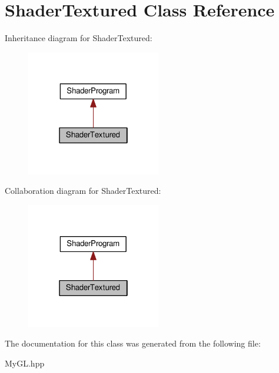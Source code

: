 \hypertarget{classShaderTextured}{}\section{Shader\+Textured Class Reference}
\label{classShaderTextured}


Inheritance diagram for Shader\+Textured\+:
\nopagebreak
\begin{figure}[H]
\begin{center}
\leavevmode
\includegraphics[width=166pt]{classShaderTextured__inherit__graph}
\end{center}
\end{figure}


Collaboration diagram for Shader\+Textured\+:
\nopagebreak
\begin{figure}[H]
\begin{center}
\leavevmode
\includegraphics[width=166pt]{classShaderTextured__coll__graph}
\end{center}
\end{figure}


The documentation for this class was generated from the following file\+:\begin{DoxyCompactItemize}
\item 
My\+G\+L.\+hpp\end{DoxyCompactItemize}
